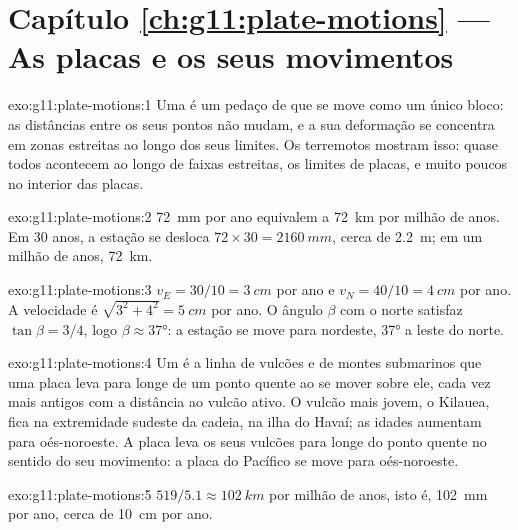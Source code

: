 \section*{Capítulo \ref{ch:g11:plate-motions} --- As placas e os seus movimentos}

\begin{solution}{exo:g11:plate-motions:1}
Uma  é um pedaço de  que se move como um único bloco:
as distâncias entre os seus pontos não mudam, e a sua deformação se
concentra em zonas estreitas ao longo dos seus limites. Os terremotos
mostram isso: quase todos acontecem ao longo de faixas estreitas, os limites
de placas, e muito poucos no interior das placas.
\end{solution}

\begin{solution}{exo:g11:plate-motions:2}
\qty{72}{mm} por ano equivalem a \qty{72}{km} por milhão de anos. Em 30
anos, a estação se desloca $72 \times 30 = \qty{2160}{mm}$, cerca de
\qty{2.2}{m}; em um milhão de anos, \qty{72}{km}.
\end{solution}

\begin{solution}{exo:g11:plate-motions:3}
$v_E = 30/10 = \qty{3}{cm}$ por ano e $v_N = 40/10 = \qty{4}{cm}$ por ano. A
velocidade é $\sqrt{3^2 + 4^2} = \qty{5}{cm}$ por ano. O ângulo $\beta$ com
o norte satisfaz $\tan\beta = 3/4$, logo $\beta \approx \ang{37}$: a estação
se move para nordeste, \ang{37} a leste do norte.
\end{solution}

\begin{solution}{exo:g11:plate-motions:4}
Um  é a linha de vulcões e de montes submarinos que
uma placa leva para longe de um ponto quente ao se mover sobre ele, cada vez
mais antigos com a distância ao vulcão ativo. O vulcão mais jovem, o
Kilauea, fica na extremidade sudeste da cadeia, na ilha do Havaí; as idades
aumentam para oés-noroeste. A placa leva os seus vulcões para longe do ponto
quente no sentido do seu movimento: a placa do Pacífico se move para
oés-noroeste.
\end{solution}

\begin{solution}{exo:g11:plate-motions:5}
$519/5.1 \approx \qty{102}{km}$ por milhão de anos, isto é, \qty{102}{mm}
por ano, cerca de \qty{10}{cm} por ano.
\end{solution}

